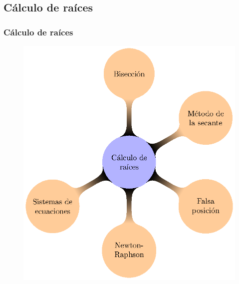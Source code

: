 \subsection*{Cálculo de raíces}
\begin{frame}[fragile]
\frametitle{Cálculo de raíces}
\begin{figure}
    \centering
    \includegraphics[scale=0.7]{Imagenes/MapaMental_Tema2_01.eps}
\end{figure}
\end{frame}
